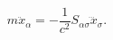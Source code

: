 \begin{equation}
     m\ddot{x}_{\alpha}=-\frac{1}{c^2}S_{\alpha\sigma}\dddot{x}_{\sigma}.
     \label{WR3}
\end{equation}

